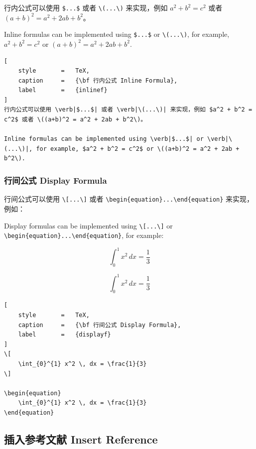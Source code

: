 \documentclass{article}
\begin{document}
行内公式可以使用 \verb|$...$| 或者 \verb|\(...\)| 来实现，例如 $a^2 + b^2 = c^2$ 或者 \((a+b)^2 = a^2 + 2ab + b^2\)。

Inline formulas can be implemented using \verb|$...$| or \verb|\(...\)|, for example, $a^2 + b^2 = c^2$ or \((a+b)^2 = a^2 + 2ab + b^2\).

\begin{lstlisting}[
    style       =   TeX,
    caption     =   {\bf 行内公式 Inline Formula},
    label       =   {inlinef}
]
行内公式可以使用 \verb|$...$| 或者 \verb|\(...\)| 来实现，例如 $a^2 + b^2 = c^2$ 或者 \((a+b)^2 = a^2 + 2ab + b^2\)。

Inline formulas can be implemented using \verb|$...$| or \verb|\(...\)|, for example, $a^2 + b^2 = c^2$ or \((a+b)^2 = a^2 + 2ab + b^2\).
\end{lstlisting}

\subsubsection{行间公式 Display Formula}

行间公式可以使用 \verb|\[...\]| 或者 \verb|\begin{equation}...\end{equation}| 来实现，例如：

Display formulas can be implemented using \verb|\[...\]| or \verb|\begin{equation}...\end{equation}|, for example:


\[
    \int_{0}^{1} x^2 \, dx = \frac{1}{3}
\]


\begin{equation}
    \int_{0}^{1} x^2 \, dx = \frac{1}{3}
\end{equation}


\begin{lstlisting}[
    style       =   TeX,
    caption     =   {\bf 行间公式 Display Formula},
    label       =   {displayf}
]
\[
    \int_{0}^{1} x^2 \, dx = \frac{1}{3}
\]

\begin{equation}
    \int_{0}^{1} x^2 \, dx = \frac{1}{3}
\end{equation}

\end{lstlisting}



\subsection{插入参考文献 Insert Reference}
\end{document}
